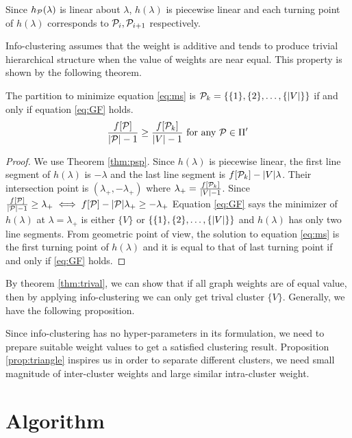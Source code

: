 \documentclass{article}
\begin{document}
Since $h_{\P}(\lambda)$ is linear about $\lambda$, $h(\lambda)$ is piecewise linear and each turning point of $h(\lambda)$ corresponds to $\P_i, \P_{i+1}$ respectively. 

Info-clustering assumes that the weight is additive and tends to produce trivial hierarchical structure when the value of weights are near equal. This property is shown by the following theorem.
\begin{theorem}\label{thm:trival}
The partition to minimize equation \eqref{eq:ms} is $\P_k = \{\{1\},\{2\},\dots,\{\abs{V}\}\}$ if and only if equation \eqref{eq:GF} holds.
\begin{equation}\label{eq:GF}
\frac{f[\P]}{\abs{\P}-1} \geq \frac{f[\P_k]}{\abs{V}-1} \textrm{ for any } \P \in \Pi'
\end{equation}
\end{theorem}
\begin{proof}
We use Theorem \ref{thm:psp}. Since $h(\lambda)$ is piecewise linear, the first line segment of $h(\lambda)$ is $ - \lambda $ and the last line segment is $ f[\P_k] - \abs{V} \lambda$. Their intersection point is $(\lambda_{+}, -\lambda_{+})$ where $\lambda_{+} = \frac{f[\P_k]}{\abs{V}-1}$. Since $\frac{f[\P]}{\abs{\P}-1} \geq \lambda_{+} \iff f[\P] - \abs{\P}\lambda_{+} \geq - \lambda_{+}$ Equation \eqref{eq:GF} says the minimizer of $h(\lambda)$ at $\lambda = \lambda_{+}$ is either $\{V\}$ or $\{\{1\},\{2\},\dots,\{\abs{V}\}\}$ and $h(\lambda)$ has only two line segments. From geometric point of view, the solution to equation \eqref{eq:ms} is the first turning point of $h(\lambda)$ and it is equal to that of last turning point if and only if \eqref{eq:GF} holds.
\end{proof}
By theorem \ref{thm:trival}, we can show that if all graph weights are of equal value, then by applying info-clustering we can only get trival cluster $\{V\}$. Generally, we have the following proposition.


Since info-clustering has no hyper-parameters in its formulation, we need to prepare suitable weight values to get a satisfied clustering result.
Proposition \ref{prop:triangle} inspires us in order to separate different clusters, we need small magnitude of inter-cluster weights and large similar intra-cluster weight.

\section{Algorithm}\label{sec:algorithm}
\end{document}
